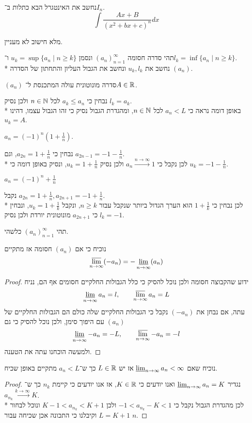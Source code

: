 \Subquestion{}
נחשב את האינטגרל הבא כתלות ב־$I_n$.
\[
	\int \frac{Ax + B}{{(x^2 + bx + c)}^n} dx
\]

מלא חישוב לא מעניין.

\Question{}
תהי סדרה חסומה ${(a_n)}_{n = 1}^\infty$ ונסמן $u_k = \sup\{ a_n \mid n \ge k \}$ ו־$l_k = \inf\{ a_n \mid n \ge k \}$. \\*
נחשב את $u_k, l_k$ ונחשב את הגבול העליון והתחתון של הסדרה $(a_n)$.

\Subquestion{}
$(a_n)$ סדרה מונוטונית עולה המתכנסת ל־$A \in \mathbb{R}$.

נבחין כי $a_k \le a_n$ לכל $n \in \mathbb{N}$ ולכן נסיק $l_k = a_k$. \\*
באופן דומה נראה כי $a_n < L$ לכל $n \in \mathbb{N}$, ומהגדרת הגבול נסיק כי זהו הגבול עצמו, דהינו $u_k = A$.

\Subquestion{}
$a_n = {(-1)}^n (1 + \frac{1}{n})$.

נבחין כי $a_{2n} = 1 + \frac{1}{n}$, וגם $a_{2n - 1} = -1 - \frac{1}{n}$. \\*
לכן נקבל כי $a_n \xrightarrow{n \to \infty} 1$ ולכן נסיק $u_k = 1 + \frac{1}{n}$, ונסיק באופן דומה כי $u_k = -1 - \frac{1}{n}$.

\Subquestion{}
$a_n = {(-1)}^n + \frac{1}{n}$

נקבל $a_{2n} = 1 + \frac{1}{n}, a_{2n + 1} = -1 + \frac{1}{n}$. \\*
לכן נבחין כי $1 + \frac{1}{k}$ הוא הערך הגדול ביותר שנקבל עבור $n \ge k$, ונקבל $u_k = 1 + \frac{1}{k}$, ונבחין כי $a_{2n + 1}$ מונוטונית יורדת ולכן נסיק $l_k = -1$.

\Question{}
תהי ${(a_n)}_{n = 1}^\infty$ כלשהי.

\Subquestion{}
נוכיח כי אם $(a_n)$ חסומה אז מתקיים
\[
	\operatorname*{\overline{lim}}_{n \to \infty} (-a_n) = - \operatorname*{\underline{lim}}_{n \to \infty}(a_n)
\]
\begin{proof}
	ידוע שהקבוצה חסומה ולכן נוכל להסיק כי כלל הגבולות החלקיים חסומים אף הם, נניח
	\[
		\operatorname*{\underline{lim}}_{n \to \infty} a_n = l,
		\qquad
		\operatorname*{\overline{lim}}_{n \to \infty} a_n = L
	\]
	עתה, אם נבחן את $(-a_n)$ נקבל כי הגבולות החלקיים שלה כולם הם הגבולות החלקיים של $(a_n)$ עם היפוך סימן, ולכן נוכל להסיק כי גם
	\[
		\operatorname*{\underline{lim}}_{n \to \infty} -a_n = -L,
		\qquad
		\operatorname*{\overline{lim}}_{n \to \infty} -a_n = -l
	\]
	ולמעשה הוכחנו עתה את הטענה.
\end{proof}

\Subquestion{}
נוכיח שאם $\operatorname*{\underline{lim}}_{n \to \infty} a_n < \infty$ אז יש $L \in \mathbb{R}$ כך ש־$a_n < L$ מתקיים באופן שכיח.
\begin{proof}
	נגדיר $\operatorname*{\underline{lim}}_{n \to \infty} a_n = K$ ואנו יודעים כי $K \in \mathbb{R}$, אז אנו יודעים כי קיימת $n_k$ כך ש־$a_{n_k} \xrightarrow{k \to \infty} K$. \\*
	לכן מהגדרת הגבול נקבל כי $-1 < a_{n_k} - K < 1$ ולכן $K - 1 < a_{n_k} < K + 1$ ונוכל לבחור $L = K + 1$ וקיבלנו כי התכונה אכן שכיחה עבור $n$.
\end{proof}

